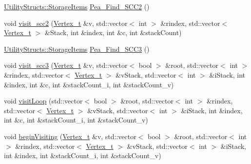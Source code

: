 \begin{DoxyCompactItemize}
\item 
\hyperlink{struct_utility_structs_1_1_storage_items}{Utility\+Structs\+::\+Storage\+Items} \hyperlink{class_pearce_a4764238b69ee587134a9009619a4cae5_a4764238b69ee587134a9009619a4cae5}{Pea\+\_\+\+Find\+\_\+\+S\+C\+C2} ()
\item 
void \hyperlink{class_pearce_a12c836f8f0dbd85e20c0f3f4f0c5fb47_a12c836f8f0dbd85e20c0f3f4f0c5fb47}{visit\+\_\+scc2} (\hyperlink{class_graph_component_ae67114a6ce5a001dc35e1996e1b45aa0_ae67114a6ce5a001dc35e1996e1b45aa0}{Vertex\+\_\+t} \&v, std\+::vector$<$ int $>$ \&rindex, std\+::vector$<$ \hyperlink{class_graph_component_ae67114a6ce5a001dc35e1996e1b45aa0_ae67114a6ce5a001dc35e1996e1b45aa0}{Vertex\+\_\+t} $>$ \&Stack, int \&index, int \&c, int \&stack\+Count)
\item 
\hyperlink{struct_utility_structs_1_1_storage_items}{Utility\+Structs\+::\+Storage\+Items} \hyperlink{class_pearce_a9d49726ab058f24cc943135458edb4f9_a9d49726ab058f24cc943135458edb4f9}{Pea\+\_\+\+Find\+\_\+\+S\+C\+C3} ()
\item 
void \hyperlink{class_pearce_a70800d4564b36fb64762d3a78f1f67d8_a70800d4564b36fb64762d3a78f1f67d8}{visit\+\_\+scc3} (\hyperlink{class_graph_component_ae67114a6ce5a001dc35e1996e1b45aa0_ae67114a6ce5a001dc35e1996e1b45aa0}{Vertex\+\_\+t} \&v, std\+::vector$<$ bool $>$ \&root, std\+::vector$<$ int $>$ \&rindex, std\+::vector$<$ \hyperlink{class_graph_component_ae67114a6ce5a001dc35e1996e1b45aa0_ae67114a6ce5a001dc35e1996e1b45aa0}{Vertex\+\_\+t} $>$ \&v\+Stack, std\+::vector$<$ int $>$ \&i\+Stack, int \&index, int \&c, int \&stack\+Count\+\_\+i, int \&stack\+Count\+\_\+v)
\item 
void \hyperlink{class_pearce_a323fc3337d5849680065986d6ef7163c_a323fc3337d5849680065986d6ef7163c}{visit\+Loop} (std\+::vector$<$ bool $>$ \&root, std\+::vector$<$ int $>$ \&rindex, std\+::vector$<$ \hyperlink{class_graph_component_ae67114a6ce5a001dc35e1996e1b45aa0_ae67114a6ce5a001dc35e1996e1b45aa0}{Vertex\+\_\+t} $>$ \&v\+Stack, std\+::vector$<$ int $>$ \&i\+Stack, int \&index, int \&c, int \&stack\+Count\+\_\+i, int \&stack\+Count\+\_\+v)
\item 
void \hyperlink{class_pearce_ab9090eeb4466701bc8ba913d8f9f5b50_ab9090eeb4466701bc8ba913d8f9f5b50}{begin\+Visiting} (\hyperlink{class_graph_component_ae67114a6ce5a001dc35e1996e1b45aa0_ae67114a6ce5a001dc35e1996e1b45aa0}{Vertex\+\_\+t} \&v, std\+::vector$<$ bool $>$ \&root, std\+::vector$<$ int $>$ \&rindex, std\+::vector$<$ \hyperlink{class_graph_component_ae67114a6ce5a001dc35e1996e1b45aa0_ae67114a6ce5a001dc35e1996e1b45aa0}{Vertex\+\_\+t} $>$ \&v\+Stack, std\+::vector$<$ int $>$ \&i\+Stack, int \&index, int \&stack\+Count\+\_\+i, int \&stack\+Count\+\_\+v)

\end{DoxyCompactItemize}
